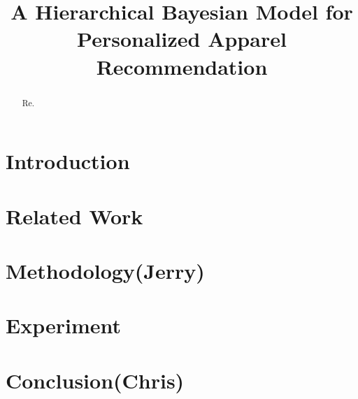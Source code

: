\documentclass[letterpaper]{article}
\title{A Hierarchical Bayesian Model for Personalized Apparel Recommendation}
\author{}
\begin{document}
\maketitle

\begin{abstract}
Re.
\end{abstract}

\section{Introduction}
\label{sec:intro}


\section{Related Work}
\label{sec:related}


\section{Methodology(Jerry)}
\label{sec:method}

\section{Experiment}
\label{sec:experiment}


\section{Conclusion(Chris)}
\label{sec:conclusion}





\end{document}
